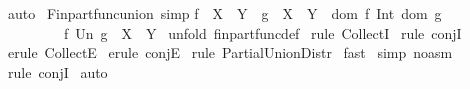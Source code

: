 \begin{isabellebody}
\isamarkupfalse%
\ auto\isanewline
{}\isamarkupfalse%
%
\endisatagproof
{\isafoldproof}%
%
\isadelimproof
\isanewline
%
\endisadelimproof
\isanewline
\isanewline
{}\isamarkupfalse%
\ Fin{\isacharunderscore}part{\isacharunderscore}func{\isacharunderscore}union\ {\isacharbrackleft}simp{\isacharbrackright}{\isacharcolon}\isanewline
{\isachardoublequoteopen}{\isacharbrackleft}{\isacharbar}f\ {\isacharcolon}\ {\isacharparenleft}X\ {\isacharminus}{\isacharbar}{\isacharbar}{\isacharminus}{\isachargreater}\ Y{\isacharparenright}\ {\isacharsemicolon}\ g\ {\isacharcolon}\ {\isacharparenleft}X\ {\isacharminus}{\isacharbar}{\isacharbar}{\isacharminus}{\isachargreater}\ Y{\isacharparenright}\ {\isacharsemicolon}\ {\isacharparenleft}{\isacharparenleft}dom\ f{\isacharparenright}\ Int\ {\isacharparenleft}dom\ g{\isacharparenright}{\isacharparenright}\ {\isacharequal}\ {\isacharbraceleft}{\isacharbraceright}{\isacharbar}{\isacharbrackright}\ {\isacharequal}{\isacharequal}{\isachargreater}\ \isanewline
\ \ \ \ \ \ \ \ \ f\ Un\ g\ {\isacharcolon}\ {\isacharparenleft}X\ {\isacharminus}{\isacharbar}{\isacharbar}{\isacharminus}{\isachargreater}\ Y{\isacharparenright}{\isachardoublequoteclose}\isanewline
%
\isadelimproof
%
\endisadelimproof
%
\isatagproof
{}\isamarkupfalse%
\ {\isacharparenleft}unfold\ fin{\isacharunderscore}part{\isacharunderscore}func{\isacharunderscore}def{\isacharparenright}\isanewline
{}\isamarkupfalse%
\ {\isacharparenleft}rule\ CollectI{\isacharparenright}\isanewline
{}\isamarkupfalse%
\ {\isacharparenleft}rule\ conjI{\isacharparenright}\isanewline
{}\isamarkupfalse%
\ {\isacharparenleft}erule\ CollectE{\isacharparenright}{\isacharplus}\isanewline
{}\isamarkupfalse%
\ {\isacharparenleft}erule\ conjE{\isacharparenright}{\isacharplus}\isanewline
{}\isamarkupfalse%
\ {\isacharparenleft}rule\ Partial{\isacharunderscore}Union{\isacharunderscore}Distr{\isacharparenright}\isanewline
{}\isamarkupfalse%
\ fast\isanewline
{}\isamarkupfalse%
\ {\isacharparenleft}simp\ {\isacharparenleft}no{\isacharunderscore}asm{\isacharparenright}{\isacharparenright}\isanewline
{}\isamarkupfalse%
\ {\isacharparenleft}rule\ conjI{\isacharparenright}\isanewline
{}\isamarkupfalse%
\ auto\isanewline
{}\isamarkupfalse%
%
\endisatagproof
{\isafoldproof}%
%
\isadelimproof
%
\endisadelimproof
%
\isamarkuptrue%
\isamarkupfalse%

\end{isabellebody}
